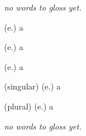 \begin{glosses}
\par \textit{no words to gloss yet.}
\end{glosses}

\begin{glosses}
\par {} (e.) {a}
\par {} (e.) {a}
\par {} (e.) {a}
\par {} (singular) (e.) {a}
\par {} (plural) (e.) {a}
\end{glosses}

\begin{glosses}
\par \textit{no words to gloss yet.}
\end{glosses}

